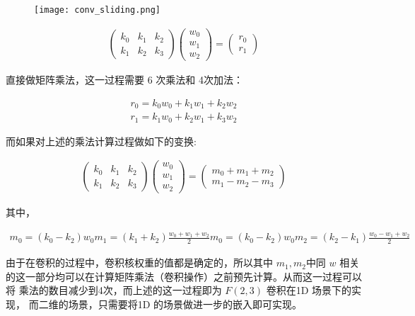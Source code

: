 \begin{figure}
\label{fig:conv_slide}
  \texttt{[image: conv\_sliding.png]}
\end{figure}


\begin{align}
  \begin{pmatrix}
    k_0 & k_1 & k_2 \\
    k_1 & k_2 & k_3 
  \end{pmatrix}
  \begin{pmatrix}
    w_0\\
    w_1\\
    w_2
  \end{pmatrix}
  =
  \begin{pmatrix}
    r_0 \\
    r_1
  \end{pmatrix}
\end{align}

直接做矩阵乘法，这一过程需要 6 次乘法和 4次加法：

\begin{align}
  r_0 = k_0 w_0 + k_1 w_1 + k_2 w_2 \\
  r_1 = k_1 w_0 + k_2 w_1 + k_3 w_2 
\end{align}

而如果对上述的乘法计算过程做如下的变换:

\begin{align}
\label{eq:winograd_mul}
  \begin{pmatrix}
    k_0 & k_1 & k_2 \\
    k_1 & k_2 & k_3 
  \end{pmatrix}
  \begin{pmatrix}
    w_0\\
    w_1\\
    w_2
  \end{pmatrix}
  =
  \begin{pmatrix}
    m_0 + m_1 + m_2 \\
    m_1 - m_2 - m_3
  \end{pmatrix}
\end{align}

其中，

\begin{align}
  m_0 = (k_0 - k_2) w_0
  m_1 = (k_1 + k_2) \frac{w_0 + w_1 + w_2}{2}
  m_0 = (k_0 - k_2) w_0
  m_2 = (k_2 - k_1) \frac{w_0 - w_1 + w_2}{2}
\end{align}

由于在卷积的过程中，卷积核权重的值都是确定的，所以其中 $m_1, m_2$中同 $w$ 相关
的这一部分均可以在计算矩阵乘法（卷积操作）之前预先计算。从而这一过程可以将
乘法的数目减少到4次，而上述的这一过程即为 $F(2, 3)$ 卷积在1D 场景下的实现，
而二维的场景，只需要将1D 的场景做进一步的嵌入即可实现。

